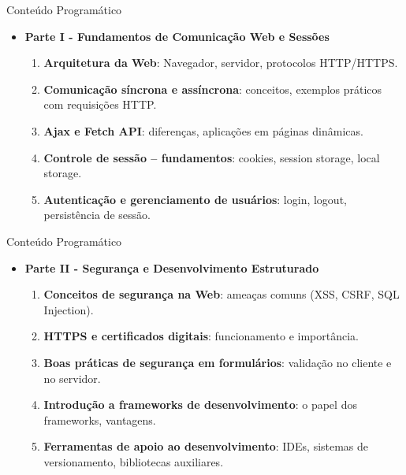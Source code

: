 \documentclass{beamer}
\begin{document}
\begin{frame}{Conteúdo Programático}
    \begin{itemize}
        \item \textbf{Parte I - Fundamentos de Comunicação Web e Sessões}
            \begin{enumerate}
                \justifying
                \item \textbf{Arquitetura da Web}: Navegador, servidor, protocolos HTTP/HTTPS.
                \item \textbf{Comunicação síncrona e assíncrona}: conceitos, exemplos práticos com requisições HTTP.
                \item \textbf{Ajax e Fetch API}: diferenças, aplicações em páginas dinâmicas.
                \item\textbf{ Controle de sessão – fundamentos}: cookies, session storage, local storage.
                \item \textbf{Autenticação e gerenciamento de usuários}: login, logout, persistência de sessão.
            \end{enumerate}
    \end{itemize}
\end{frame}

\begin{frame}{Conteúdo Programático}
    \begin{itemize}
        \justifying
        \item \textbf{Parte II - Segurança e Desenvolvimento Estruturado}
            \begin{enumerate}
                \justifying
                \item \textbf{Conceitos de segurança na Web}: ameaças comuns (XSS, CSRF, SQL Injection).
                \item \textbf{HTTPS e certificados digitais}: funcionamento e importância.
                \item \textbf{Boas práticas de segurança em formulários}: validação no cliente e no servidor.
                \item \textbf{Introdução a frameworks de desenvolvimento}: o papel dos frameworks, vantagens.
                \item \textbf{Ferramentas de apoio ao desenvolvimento}: IDEs, sistemas de versionamento, bibliotecas auxiliares.
            \end{enumerate}
    \end{itemize}
\end{frame}
\end{document}

